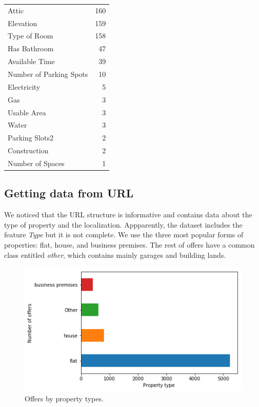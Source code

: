 \documentclass[11pt,a4paper]{article}
\begin{document}
\begin{table}[ht]
\begin{tabular}{lr}
    Attic                            &   160 \\
    Elevation                        &   159 \\
    Type of Room                     &   158 \\
    Has Bathroom                     &    47 \\
    Available Time                   &    39 \\
    Number of Parking Spots          &    10 \\
    Electricity                      &     5 \\
    Gas                              &     3 \\
    Usable Area                      &     3 \\
    Water                            &     3 \\
    Parking Slots2                   &     2 \\
    Construction                     &     2 \\
    Number of Spaces                 &     1 \\
    \bottomrule
  \end{tabular}
\end{table}

\subsection{Getting data from URL}
We noticed that the URL structure is informative and contains data about the type of property and the localization. Appparently, the dataset includes the feature \emph{Type} but it is not complete. We use the three most popular forms of properties: flat, house, and business premises. The rest of offers have a common class entitled \emph{other}, which contains mainly garages and building lands. 



\begin{figure}[htpb]
  \centering
  \includegraphics[width=0.8\linewidth]{./plots/proporty_types_h.png}
  \caption{Offers by property types.}
  \label{fig:property_types}
\end{figure}
\end{document}
